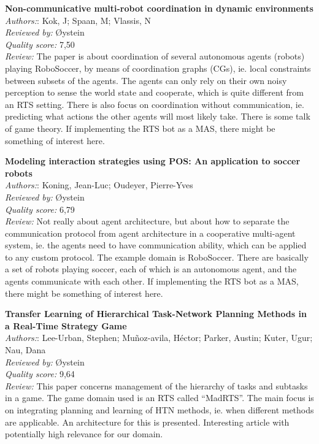 \textbf{Non-communicative multi-robot coordination in dynamic environments}\\
\textit{Authors:}: Kok, J; Spaan, M; Vlassis, N\\
\textit{Reviewed by:} {\O}ystein\\
\textit{Quality score:} 7,50\\
\textit{Review:} The paper is about coordination of several autonomous agents (robots) playing RoboSoccer, by means of coordination graphs (CGs), ie. local constraints between subsets of the agents. The agents can only rely on their own noisy perception to sense the world state and cooperate, which is quite different from an RTS setting. There is also focus on coordination without communication, ie. predicting what actions the other agents will most likely take. There is some talk of game theory.  If implementing the RTS bot as a MAS, there might be something of interest here.

\textbf{Modeling interaction strategies using POS: An application to soccer robots}\\
\textit{Authors:}: Koning, Jean-Luc; Oudeyer, Pierre-Yves\\
\textit{Reviewed by:} {\O}ystein\\
\textit{Quality score:} 6,79\\
\textit{Review:} Not really about agent architecture, but about how to separate the communication protocol from agent architecture in a cooperative multi-agent system, ie. the agents need to have communication ability, which can be applied to any custom protocol. The example domain is RoboSoccer. There are basically a set of robots playing soccer, each of which is an autonomous agent, and the agents communicate with each other. If implementing the RTS bot as a MAS, there might be something of interest here.

\textbf{Transfer Learning of Hierarchical Task-Network Planning Methods in a Real-Time Strategy Game}\\
\textit{Authors:}: Lee-Urban, Stephen; Mu\~{n}oz-avila, H\'{e}ctor; Parker, Austin; Kuter, Ugur; Nau, Dana\\
\textit{Reviewed by:} {\O}ystein\\
\textit{Quality score:} 9,64\\
\textit{Review:} This paper concerns management of the hierarchy of tasks and subtasks in a game. The game domain used is an RTS called ``MadRTS''. The main focus is on integrating planning and learning of HTN methods, ie. when different methods are applicable. An architecture for this is presented. Interesting article with potentially high relevance for our domain.

